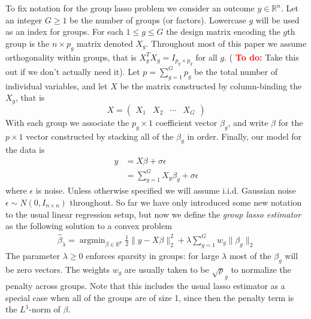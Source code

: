 \documentclass{imsart}
\newcommand{\argmin}{\mathop{\mathrm{argmin}}}
\newcommand{\todo}{\textcolor{red}{\textbf{To do: }}}
\newcommand{\real}{\mathbb{R}}
\begin{document}
To fix notation for the group lasso problem we consider an outcome $y
\in \real^n$.  Let an integer $G \geq 1$ be the number of groups (or
factors).  Lowercase $g$ will be used as an index for groups.  For
each $1 \leq g \leq G$ the design matrix encoding the $g$th group is
the $n \times p_g$ matrix denoted $X_g$.  Throughout most of this
paper we assume orthogonality within groups, that is $X_g^T X_g =
I_{p_g \times p_g}$ for all $g$. ( \todo Take this out if we don't
actually need it).  Let $p = \sum_{g=1}^G p_g$ be the total number of
individual variables, and let $X$ be the matrix constructed by
column-binding the $X_g$, that is  
\begin{equation*}
X = \begin{pmatrix} X_1 & X_2 & \cdots & X_G  \end{pmatrix}
\end{equation*}
With each group we associate the $p_g \times 1$ coefficient vector
$\beta_g$, and write $\beta$ for the $p \times 1$ vector constructed
by stacking all of the $\beta_g$ in order.  Finally, our model for the
data is
\begin{equation}
\begin{aligned}
\label{eq:gmodel}
y & = X \beta + \sigma \epsilon \\
   & = \sum_{g=1}^G X_g \beta_g + \sigma \epsilon
\end{aligned}
\end{equation}
where $\epsilon$ is noise.  Unless otherwise specified we will assume
i.i.d. Gaussian noise $\epsilon \sim N(0, I_{n \times n})$ throughout.
So far we have only introduced some new notation to the usual linear
regression setup, but now we define the \emph{group lasso estimator}
as the following solution to a convex problem 
\begin{equation}
\begin{aligned}
\label{eq:gsoln}
\displaystyle \hat \beta_\lambda = \argmin_{\beta \in \real^p} \frac{1}{2} \| y - X \beta \|_2^2 +
   \lambda \sum_{g=1}^G w_g \| \beta_g \|_2
\end{aligned}
\end{equation}
The parameter $\lambda \geq 0$ enforces sparsity in groups: for large
$\lambda$ most of the $\beta_g$ will be zero vectors. The weights
$w_g$ are usually taken to be $\sqrt p_g$ to normalize the penalty
across groups.  Note that this includes the usual lasso estimator as a
special case when all of the groups are of size 1, since then the
penalty term is the $L^1$-norm of $\beta$. 
\end{document}
